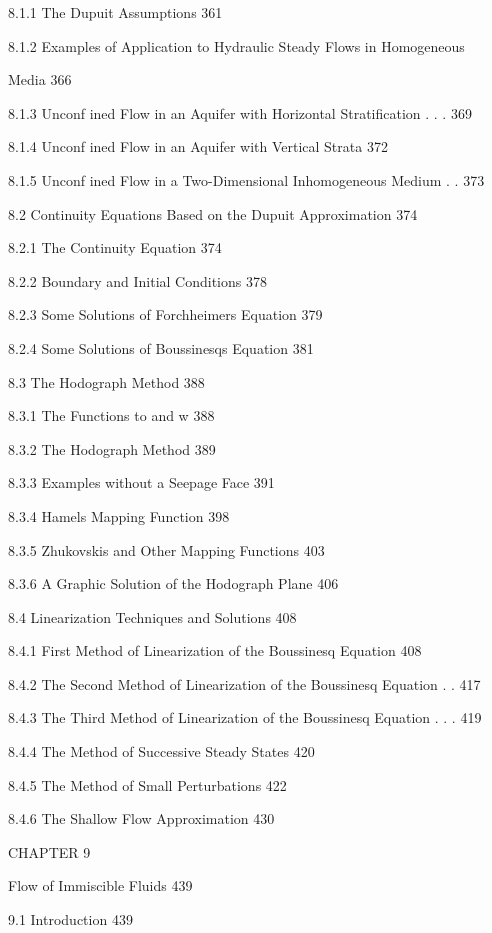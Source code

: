 \documentclass[
  11pt,
]{article}
\begin{document}
8.1.1 The Dupuit Assumptions 361 \par
8.1.2 Examples of Application to Hydraulic Steady Flows in Homogeneous \par
Media 366 \par
8.1.3 Unconf ined Flow in an Aquifer with Horizontal Stratification . . . 369 \par
8.1.4 Unconf ined Flow in an Aquifer with Vertical Strata 372 \par
8.1.5 Unconf ined Flow in a Two-Dimensional Inhomogeneous Medium . . 373 \par
8.2 Continuity Equations Based on the Dupuit Approximation 374 \par
8.2.1 The Continuity Equation 374 \par
8.2.2 Boundary and Initial Conditions 378 \par
8.2.3 Some Solutions of Forchheimer\textquotesingle s Equation 379 \par
8.2.4 Some Solutions of Boussinesq\textquotesingle s Equation 381 \par
8.3 The Hodograph Method 388 \par
8.3.1 The Functions to and w 388 \par
8.3.2 The Hodograph Method 389 \par
8.3.3 Examples without a Seepage Face 391 \par
8.3.4 Hamel\textquotesingle s Mapping Function 398 \par
8.3.5 Zhukovski\textquotesingle s and Other Mapping Functions 403 \par
8.3.6 A Graphic Solution of the Hodograph Plane 406 \par
8.4 Linearization Techniques and Solutions 408 \par
8.4.1 First Method of Linearization of the Boussinesq Equation 408 \par
8.4.2 The Second Method of Linearization of the Boussinesq Equation . . 417 \par
8.4.3 The Third Method of Linearization of the Boussinesq Equation . . . 419 \par
8.4.4 The Method of Successive Steady States 420 \par
8.4.5 The Method of Small Perturbations 422 \par
8.4.6 The Shallow Flow Approximation 430 \par
CHAPTER 9 \par
Flow of Immiscible Fluids 439 \par
9.1 Introduction 439 \par
\end{document}
